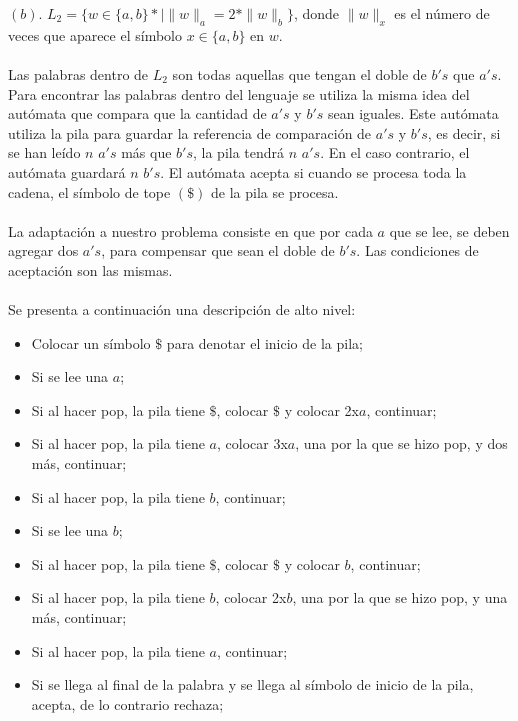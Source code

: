 \documentclass[spanish]{article}
\def\e{\varepsilon}
\def\ra{\rightarrow}
\begin{document}
\begin{center}
\end{center}
\newpage
$(b)$. $L_2=\{w\in\{a,b\}*|\|w\|_a=2*\|w\|_b\}$, donde $\|w\|_x$ es el número de veces que aparece el símbolo $x\in \{a,b\}$ en $w$.
\\\\
Las palabras dentro de $L_2$ son todas aquellas que tengan el doble de $b's$ que $a's$. Para encontrar las palabras dentro del lenguaje se utiliza la misma idea del autómata que compara que la cantidad de $a's$ y $b's$ sean iguales. Este autómata utiliza la pila para guardar la referencia de comparación de $a's$ y $b's$, es decir, si se han leído $n$ $a's$ más que $b's$, la pila tendrá $n$ $a's$. En el caso contrario, el autómata guardará $n$ $b's$. El autómata acepta si cuando se procesa toda la cadena, el símbolo de tope $(\$)$ de la pila se procesa. 
\\\\
La adaptación a nuestro problema consiste en que por cada $a$ que se lee, se deben agregar dos $a's$, para compensar que sean el doble de $b's$. Las condiciones de aceptación son las mismas.
\\\\
Se presenta a continuación una descripción de alto nivel:
\begin{itemize}
\item Colocar un símbolo $\$$ para denotar el inicio de la pila;
\item Si se lee una $a$;
\item \tab Si al hacer pop, la pila tiene $\$$, colocar $\$$ y colocar 2x$a$, continuar;
\item \tab Si al hacer pop, la pila tiene $a$, colocar 3x$a$, una por la que se hizo pop, y dos más, continuar;
\item \tab Si al hacer pop, la pila tiene $b$, continuar;
\item Si se lee una $b$;
\item \tab Si al hacer pop, la pila tiene $\$$, colocar $\$$ y colocar $b$, continuar;
\item \tab Si al hacer pop, la pila tiene $b$, colocar 2x$b$, una por la que se hizo pop, y una más, continuar;
\item \tab Si al hacer pop, la pila tiene $a$, continuar;
\item Si se llega al final de la palabra y se llega al símbolo de inicio de la pila, acepta, de lo contrario rechaza;
\end{itemize}
\end{document}
